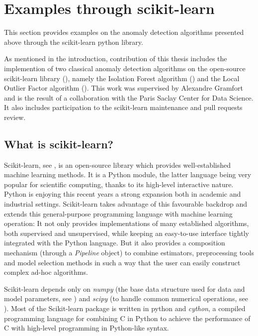 \section{Examples through scikit-learn}
\label{back:sklearn-contribution}
This section provides examples on the anomaly detection algorithms presented above through the scikit-learn python library.

As mentioned in the introduction, contribution of this thesis includes the implemention of two classical anomaly detection algorithms on the open-source scikit-learn library (\cite{sklearn2011}), namely the Isolation Forest algorithm (\cite{Liu2008}) and the Local Outlier Factor algorithm (\cite{Breunig2000LOF}). %
This work was supervised by Alexandre Gramfort and is the result of a collaboration with the Paris Saclay Center for Data Science. It also includes participation to the scikit-learn maintenance and pull requests review.



\subsection{What is scikit-learn?}
Scikit-learn, see \cite{sklearn2011}, is an open-source library which provides well-established machine learning methods.
It is a Python module, the latter language being very popular for scientific computing, thanks to its high-level interactive nature. Python is enjoying this recent years a strong expansion both in academic and industrial settings. Scikit-learn takes advantage of this favourable backdrop and extends this general-purpose programming language with machine learning operation: It not only provides implementations of many established algorithms, both supervised and unsupervised, while keeping an easy-to-use interface tightly integrated with the Python language. But it also provides a composition mechanism (through a \emph{Pipeline} object) to combine estimators, preprocessing tools and model selection methods in such a way that the user can easily construct complex ad-hoc algorithms.

Scikit-learn depends only on \emph{numpy} (the base data structure used for data and model parameters, see \cite{Vanderwalt2011numpy}) and \emph{scipy} (to handle common numerical operations, see \cite{Jones2015scipy}).
Most of the Scikit-learn package is written in python and \emph{cython}, a compiled programming language for combining C in Python to achieve the performance of C with high-level programming in Python-like syntax.


